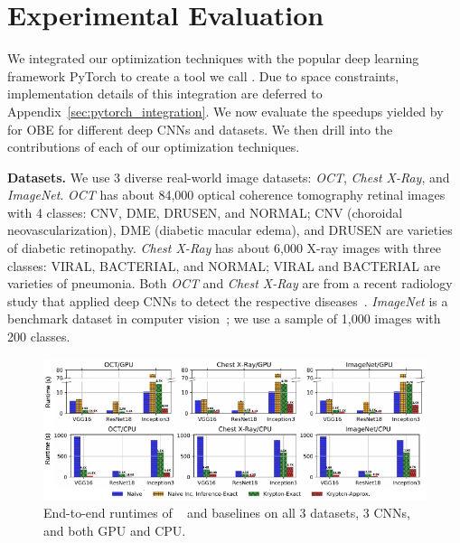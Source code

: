 \section{Experimental Evaluation}
We integrated our optimization techniques with the popular deep learning framework PyTorch to create a tool we call \system. Due to space constraints, implementation details of this integration are deferred to Appendix~\ref{sec:pytorch_integration}. We now evaluate the speedups yielded by \system~ for OBE for different deep CNNs and datasets. We then drill into the contributions of each of our optimization techniques.

\vspace{2mm}
\noindent \textbf{Datasets.}
We use 3 diverse real-world image datasets: \textit{OCT}, \textit{Chest X-Ray}, and \textit{ImageNet}. \textit{OCT} has about 84,000 optical coherence tomography retinal images with 4 classes: CNV, DME, DRUSEN, and NORMAL; CNV (choroidal neovascularization), DME (diabetic macular edema), and DRUSEN are varieties of diabetic retinopathy. \textit{Chest X-Ray} has about 6,000 X-ray images with three classes: VIRAL, BACTERIAL, and NORMAL; VIRAL and BACTERIAL are varieties of pneumonia. Both \textit{OCT} and \textit{Chest X-Ray} are from a recent radiology study that applied deep CNNs to detect the respective diseases~\cite{kermany2018identifying}. \textit{ImageNet} is a benchmark dataset in computer vision~\cite{deng2009imagenet}; we use a sample of 1,000 images with 200 classes.

\begin{figure}[t]
\includegraphics[width=\textwidth]{images/5_1_all_edited_b}
\vspace{-8mm}
\caption{End-to-end runtimes of \system~ and baselines on all 3 datasets, 3 CNNs, and both GPU and CPU.}
\label{fig:5_1_all_edited}
\end{figure}

